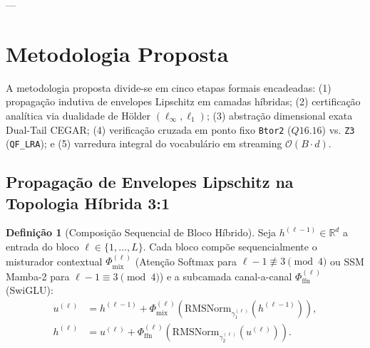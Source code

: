 \documentclass[11pt,a4paper]{article}
\theoremstyle{definition}
\newtheorem{definition}{Definição}
\begin{document}
---

\section{Metodologia Proposta}

A metodologia proposta divide-se em cinco etapas formais encadeadas: (1) propagação indutiva de envelopes Lipschitz em camadas híbridas; (2) certificação analítica via dualidade de Hölder $(\ell_\infty, \ell_1)$; (3) abstração dimensional exata Dual-Tail CEGAR; (4) verificação cruzada em ponto fixo \texttt{Btor2} ($Q16.16$) vs. \texttt{Z3} (\texttt{QF\_LRA}); e (5) varredura integral do vocabulário em streaming $\mathcal{O}(B \cdot d)$.

\subsection{Propagação de Envelopes Lipschitz na Topologia Híbrida 3:1}

\begin{definition}[Composição Sequencial de Bloco Híbrido]
Seja $h^{(\ell-1)} \in \mathbb{R}^d$ a entrada do bloco $\ell \in \{1, \dots, L\}$. Cada bloco compõe sequencialmente o misturador contextual $\Phi_{\text{mix}}^{(\ell)}$ (Atenção Softmax para $\ell-1 \not\equiv 3 \pmod 4$ ou SSM Mamba-2 para $\ell-1 \equiv 3 \pmod 4$) e a subcamada canal-a-canal $\Phi_{\text{ffn}}^{(\ell)}$ (SwiGLU):
\begin{align}
    u^{(\ell)} &= h^{(\ell-1)} + \Phi_{\text{mix}}^{(\ell)}\!\left(\text{RMSNorm}_{\gamma_1^{(\ell)}}(h^{(\ell-1)})\right), \label{eq:sub_mix} \\
    h^{(\ell)} &= u^{(\ell)} + \Phi_{\text{ffn}}^{(\ell)}\!\left(\text{RMSNorm}_{\gamma_2^{(\ell)}}(u^{(\ell)})\right). \label{eq:sub_ffn}
\end{align}
\end{definition}
\end{document}
